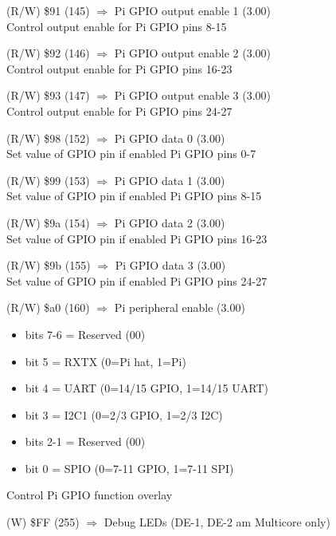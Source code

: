 (R/W) \$91 (145) $\Rightarrow$ Pi GPIO output enable 1 (3.00)\\
Control output enable for Pi GPIO pins 8-15

(R/W) \$92 (146) $\Rightarrow$ Pi GPIO output enable 2 (3.00)\\
Control output enable for Pi GPIO pins 16-23

(R/W) \$93 (147) $\Rightarrow$ Pi GPIO output enable 3 (3.00)\\
Control output enable for Pi GPIO pins 24-27

(R/W) \$98 (152) $\Rightarrow$ Pi GPIO data 0 (3.00)\\
Set value of GPIO pin if enabled Pi GPIO pins 0-7

(R/W) \$99 (153) $\Rightarrow$ Pi GPIO data 1 (3.00)\\
Set value of GPIO pin if enabled Pi GPIO pins 8-15

(R/W) \$9a (154) $\Rightarrow$ Pi GPIO data 2 (3.00)\\
Set value of GPIO pin if enabled Pi GPIO pins 16-23

(R/W) \$9b (155) $\Rightarrow$ Pi GPIO data 3 (3.00)\\
Set value of GPIO pin if enabled Pi GPIO pins 24-27

(R/W) \$a0 (160) $\Rightarrow$ Pi peripheral enable (3.00)
\begin{itemize}
\item[] bits 7-6 = Reserved (00)
\item[] bit 5 = RXTX (0=Pi hat, 1=Pi)
\item[] bit 4 = UART (0=14/15 GPIO, 1=14/15 UART)
\item[] bit 3 = I2C1 (0=2/3 GPIO, 1=2/3 I2C)
\item[] bits 2-1 = Reserved (00)
\item[] bit 0 = SPIO (0=7-11 GPIO, 1=7-11 SPI)
\end{itemize}
Control Pi GPIO function overlay

(W) \$FF (255) $\Rightarrow$ Debug LEDs (DE-1, DE-2 am Multicore only)
